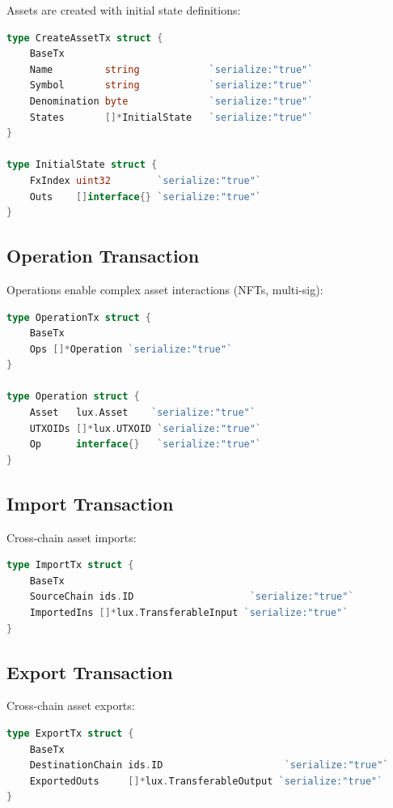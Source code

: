 \documentclass[11pt,a4paper]{article}
\begin{document}
Assets are created with initial state definitions:

\begin{lstlisting}[language=Go,caption={Asset Creation}]
type CreateAssetTx struct {
    BaseTx
    Name         string            `serialize:"true"`
    Symbol       string            `serialize:"true"`
    Denomination byte              `serialize:"true"`
    States       []*InitialState   `serialize:"true"`
}

type InitialState struct {
    FxIndex uint32        `serialize:"true"`
    Outs    []interface{} `serialize:"true"`
}
\end{lstlisting}

\subsection{Operation Transaction}

Operations enable complex asset interactions (NFTs, multi-sig):

\begin{lstlisting}[language=Go,caption={Operation Transaction}]
type OperationTx struct {
    BaseTx
    Ops []*Operation `serialize:"true"`
}

type Operation struct {
    Asset   lux.Asset    `serialize:"true"`
    UTXOIDs []*lux.UTXOID `serialize:"true"`
    Op      interface{}   `serialize:"true"`
}
\end{lstlisting}

\subsection{Import Transaction}

Cross-chain asset imports:

\begin{lstlisting}[language=Go,caption={Import Transaction}]
type ImportTx struct {
    BaseTx
    SourceChain ids.ID                    `serialize:"true"`
    ImportedIns []*lux.TransferableInput `serialize:"true"`
}
\end{lstlisting}

\subsection{Export Transaction}

Cross-chain asset exports:

\begin{lstlisting}[language=Go,caption={Export Transaction}]
type ExportTx struct {
    BaseTx
    DestinationChain ids.ID                     `serialize:"true"`
    ExportedOuts     []*lux.TransferableOutput `serialize:"true"`
}
\end{lstlisting}
\end{document}
